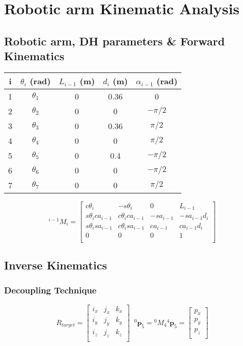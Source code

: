 \section{Robotic arm Kinematic Analysis}


\subsection{Robotic arm, DH parameters \& Forward Kinematics}

\begin{center}
\begin{tabular}{ |c|c|c|c|c| } 
\hline
i & $θ_i$ (rad) & $L_{i-1}$ (m) & $d_i$ (m) & $α_{i-1}$ (rad) \\
\hline
1 & $θ_1$ & 0 & 0.36 & 0 \\
2 & $θ_2$ & 0 & 0 & $-π/2$ \\
3 & $θ_3$ & 0 & 0.36 & $π/2$ \\
4 & $θ_4$ & 0 & 0 & $π/2$\\
5 & $θ_5$ & 0 & 0.4 & $-π/2$ \\
6 & $θ_6$ & 0 & 0 & $-π/2$ \\
7 & $θ_7$ & 0 & 0 & $π/2$ \\
\hline
\end{tabular}
\end{center}

\[
^{i-1}M_i = 
\begin{bmatrix}
c\theta_i & -s\theta_i & 0 & L_{i-1} \\
s\theta_ica_{i-1} & c\theta_ica_{i-1} & -sa_{i-1} & -sa_{i-1}d_i \\
s\theta_isa_{i-1} & c\theta_isa_{i-1} & ca_{i-1} & ca_{i-1}d_i \\
0 & 0 & 0 & 1\\
\end{bmatrix}
\]


\subsection{Inverse Kinematics}

\subsubsection{Decoupling Technique}

\[
R_{target} = 
\begin{bmatrix}
i_x & j_x & k_x\\
i_y & j_y & k_y\\
i_z & j_z & k_z\\
\end{bmatrix}
\;\;
{}^0\mathbf{p}_5 = {}^0M_4 {}^4\mathbf{p}_5 = \begin{bmatrix} p_x \\ p_y \\ p_z \\ \end{bmatrix}
\]

